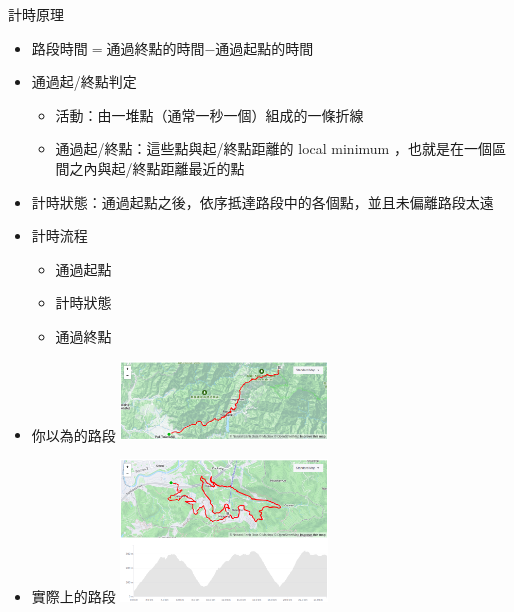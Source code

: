 \begin{frame}{計時原理}
\begin{multicols}{2}
\begin{itemize}
\item 路段時間$=$通過終點的時間$-$通過起點的時間
\item 通過起/終點判定
\begin{itemize}
\item 活動：由一堆點（通常一秒一個）組成的一條折線
\item 通過起/終點：這些點與起/終點距離的 local minimum ，也就是在一個區間之內與起/終點距離最近的點
\end{itemize}
\item 計時狀態：通過起點之後，依序抵達路段中的各個點，並且未偏離路段太遠
\item 計時流程
\begin{itemize}
\item 通過起點
\item 計時狀態
\item 通過終點
\end{itemize}
\newpage
\pause
\item 你以為的路段
\includegraphics[width=5.5cm]{wulingMap.png}
\item 實際上的路段
\includegraphics[width=5.5cm]{maokong3pMap.png}
\end{itemize}
\end{multicols}
\end{frame}

\newcommand{\yes}[1]{\alt<2>{\textcolor{red}{#1}}{\textcolor{black}{#1}}}
\newcommand{\maybe}[1]{\alt<2>{\textcolor{orange}{#1}}{\textcolor{black}{#1}}}

